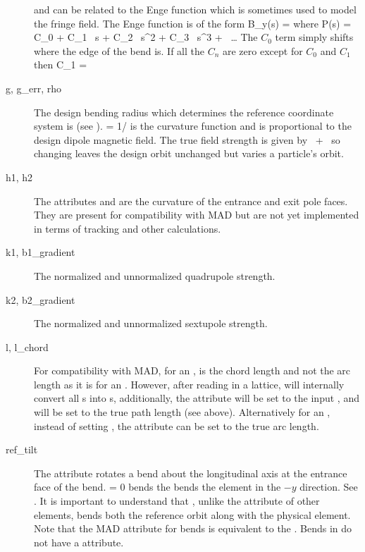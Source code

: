 \begin{description}
 and  can be related to the Enge function which is sometimes
used to model the fringe field. The Enge function is of the form
\Begineq
  B_y(s) = 
\Endeq
where
\Begineq
  P(s) = C_0 + C_1 \, s + C_2 \, s^2 + C_3 \, s^3 + \, \ldots
\Endeq
The $C_0$ term simply shifts where the edge of the bend is. If all the $C_n$
are zero except for $C_0$ and $C_1$ then 
\Begineq
  C_1 = 
\Endeq
  \item[g, g_err, rho] \Newline
The design bending radius which determines the reference coordinate
system is  (see ).  = 1/ is
the curvature function and is proportional to the design dipole
magnetic field. The true field strength is given by
~+~ so changing  leaves the design orbit
unchanged but varies a particle's orbit.
  \item[h1, h2] \Newline
The attributes  and  are the curvature of the entrance
and exit pole faces. They are present for compatibility with MAD but
are not yet implemented in terms of tracking and other calculations.
  \item[k1, b1_gradient] \Newline
The normalized and unnormalized quadrupole strength.
  \item[k2, b2_gradient] \Newline
The normalized and unnormalized sextupole strength. 
  \item[l, l_chord]  \Newline
For compatibility with MAD, for an ,  is the chord
length and not the arc length as it is for an .  However,
after reading in a lattice, \bmad will internally convert all
s into s, additionally, the  attribute
will be set to the input , and  will be set to the true
path length (see above). Alternatively for an , instead of
setting , the  attribute can be set to the true arc
length.
  \item[ref_tilt] \Newline
The  attribute rotates a bend about the longitudinal axis
at the entrance face of the bend.  = 0 bends the bends
the element in the $-y$ direction. See . It is
important to understand that , unlike the 
attribute of other elements, bends both the reference orbit along with
the physical element. Note that the MAD  attribute for bends
is equivalent to the \bmad {}. Bends in \bmad do not have
a  attribute.
  \end{description}

